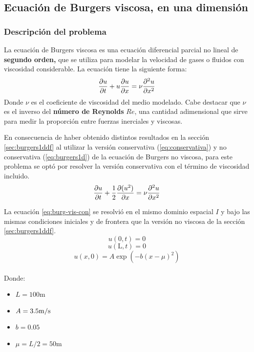 \documentclass[12pt]{article}
\newcommand{\mpers}{\unit[per-mode = symbol]{\metre\per\second}}
\begin{document}
	\newpage
	\subsection{Ecuación de Burgers viscosa, en una dimensión}
	\label{sec:burg-vis1ddf}
	\subsubsection{Descripción del problema}
	La ecuación de Burgers viscosa es una ecuación diferencial parcial no lineal de \textbf{segundo orden,} que se utiliza para modelar la velocidad de gases o fluidos con viscosidad considerable. La ecuación tiene la siguiente forma:
	\begin{equation}
		\pdv{u}{t}+u\pdv{u}{x}=\nu \pdv{^2 u}{x^2}
		\label{eq:burg-vis}
	\end{equation}
	Donde $\nu$ es el coeficiente de viscosidad del medio modelado. Cabe destacar que $\nu$ es el inverso del \textbf{número de Reynolds} $Re$, una cantidad adimensional que sirve para medir la proporción entre fuerzas inerciales y viscosas. 

	En consecuencia de haber obtenido distintos resultados en la sección \ref{sec:burgers1ddf} al utilizar la versión conservativa (\ref{eq:conservativa}) y no conservativa (\ref{eq:burgers1d}) de la ecuación de Burgers no viscosa, para este problema se optó por resolver la versión conservativa con el término de viscosidad incluido.
	\begin{equation}
		\pdv{u}{t}+\frac{1}{2}\pdv{(u^2)}{x}=\nu \pdv{^2 u}{x^2}
		\label{eq:burg-vis-con}
	\end{equation}
	
 	La ecuación \ref{eq:burg-vis-con} se resolvió en el mismo dominio espacial $I$ y bajo las mismas condiciones iniciales y de frontera que la versión no viscosa de la sección \ref{sec:burgers1ddf}. 
 	\begin{equation}
 		u(0,t)=0
 	\end{equation}
 	\begin{equation}
 		u(\text{L},t)= 0
 	\end{equation}
	\begin{equation}
		u(x,0) = A\exp(-b(x-\mu)^{2})
		\label{eq:condinicial-vis}
	\end{equation}
	\\
	Donde:
	\begin{itemize}
		\item $L = 100\unit{\meter}$
		\item $A=3.5\mpers$
		\item $b=0.05$
		\item $\mu=L/2=50\unit{\meter}$
	\end{itemize}
	
\end{document}
